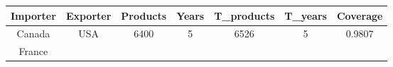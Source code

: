 \documentclass[10pt,]{article}
\begin{document}
\begin{longtable}[]{@{}ccccccc@{}}
\toprule
\begin{minipage}[b]{0.13\columnwidth}\centering\strut
Importer\strut
\end{minipage} & \begin{minipage}[b]{0.12\columnwidth}\centering\strut
Exporter\strut
\end{minipage} & \begin{minipage}[b]{0.12\columnwidth}\centering\strut
Products\strut
\end{minipage} & \begin{minipage}[b]{0.09\columnwidth}\centering\strut
Years\strut
\end{minipage} & \begin{minipage}[b]{0.14\columnwidth}\centering\strut
T\_products\strut
\end{minipage} & \begin{minipage}[b]{0.11\columnwidth}\centering\strut
T\_years\strut
\end{minipage} & \begin{minipage}[b]{0.11\columnwidth}\centering\strut
Coverage\strut
\end{minipage}\tabularnewline
\midrule
\endhead
\begin{minipage}[t]{0.13\columnwidth}\centering\strut
Canada\strut
\end{minipage} & \begin{minipage}[t]{0.12\columnwidth}\centering\strut
USA\strut
\end{minipage} & \begin{minipage}[t]{0.12\columnwidth}\centering\strut
6400\strut
\end{minipage} & \begin{minipage}[t]{0.09\columnwidth}\centering\strut
5\strut
\end{minipage} & \begin{minipage}[t]{0.14\columnwidth}\centering\strut
6526\strut
\end{minipage} & \begin{minipage}[t]{0.11\columnwidth}\centering\strut
5\strut
\end{minipage} & \begin{minipage}[t]{0.11\columnwidth}\centering\strut
0.9807\strut
\end{minipage}\tabularnewline
\begin{minipage}[t]{0.13\columnwidth}\centering\strut
France\strut
\end{minipage} & \begin{minipage}[t]{0.12\columnwidth}\centering\strut

\end{minipage}
\end{longtable}
\end{document}
